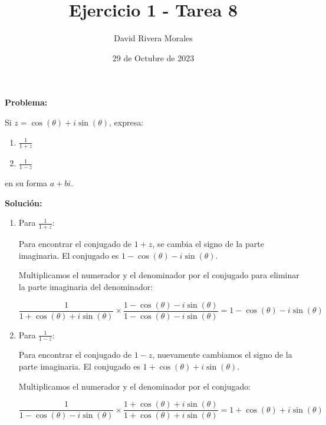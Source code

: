 \documentclass[12pt]{article}
\title{Ejercicio 1 - Tarea 8}
\author{David Rivera Morales}
\date{29 de Octubre de 2023}
\begin{document}
\maketitle

\noindent \textbf{Problema:}

Si \( z = \cos(\theta) + i\sin(\theta) \), expresa:
\begin{enumerate}
    \item \(\frac{1}{1 + z}\)
    \item \(\frac{1}{1 - z}\)
\end{enumerate}
en su forma \(a + bi\).

\vspace{1em}

\noindent \textbf{Solución:}

\begin{enumerate}
    \item Para \(\frac{1}{1 + z}\):
    
    Para encontrar el conjugado de \(1 + z\), se cambia el signo de la parte imaginaria. El conjugado es \(1 - \cos(\theta) - i\sin(\theta)\). 
    
    Multiplicamos el numerador y el denominador por el conjugado para eliminar la parte imaginaria del denominador:

    \[
    \frac{1}{1 + \cos(\theta) + i\sin(\theta)} \times \frac{1 - \cos(\theta) - i\sin(\theta)}{1 - \cos(\theta) - i\sin(\theta)} = 1 - \cos(\theta) - i\sin(\theta)
    \]

    \item Para \(\frac{1}{1 - z}\):

    Para encontrar el conjugado de \(1 - z\), nuevamente cambiamos el signo de la parte imaginaria. El conjugado es \(1 + \cos(\theta) + i\sin(\theta)\).

    Multiplicamos el numerador y el denominador por el conjugado:

    \[
    \frac{1}{1 - \cos(\theta) - i\sin(\theta)} \times \frac{1 + \cos(\theta) + i\sin(\theta)}{1 + \cos(\theta) + i\sin(\theta)} = 1 + \cos(\theta) + i\sin(\theta)
    \]
\end{enumerate}
\end{document}
